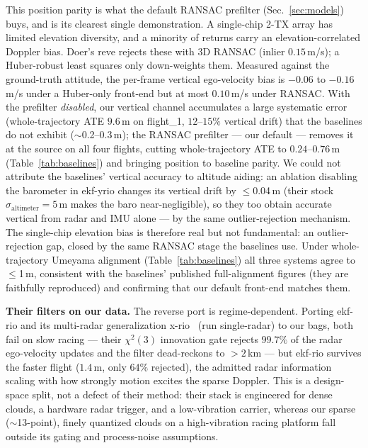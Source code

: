 \documentclass[conference]{IEEEtran}
\begin{document}
This position parity is what the default RANSAC prefilter
(Sec.~\ref{sec:models}) buys, and is its clearest single demonstration.
A single-chip 2-TX array has limited elevation diversity, and a minority
of returns carry an elevation-correlated Doppler bias.  Doer's
\mbox{reve} rejects these with 3D RANSAC (inlier $0.15$\,m/s); a
Huber-robust least squares only down-weights them.  Measured against the
ground-truth attitude, the per-frame vertical ego-velocity bias is
$-0.06$ to $-0.16$\,m/s under a Huber-only front-end but at most
$0.10$\,m/s under RANSAC.  With the prefilter \emph{disabled}, our
vertical channel accumulates a large systematic error
(whole-trajectory ATE $9.6$\,m on flight\_1, $12$--$15\%$ vertical
drift) that the baselines do not exhibit ($\sim$0.2--0.3\,m); the RANSAC
prefilter --- our default --- removes it at the source on all four
flights, cutting whole-trajectory ATE to $0.24$--$0.76$\,m
(Table~\ref{tab:baselines}) and bringing position to baseline
parity.  We could not attribute the baselines' vertical accuracy to
altitude aiding: an ablation disabling the barometer in ekf-yrio changes
its vertical drift by $\le$0.04\,m (their stock
$\sigma_\mathrm{altimeter}{=}5$\,m makes the baro near-negligible), so
they too obtain accurate vertical from radar and IMU alone --- by the
same outlier-rejection mechanism.  The single-chip elevation bias is
therefore real but not fundamental: an outlier-rejection gap, closed by
the same RANSAC stage the baselines use.  Under whole-trajectory Umeyama
alignment (Table~\ref{tab:baselines}) all three systems agree to
$\le$1\,m, consistent with the baselines' published full-alignment
figures (they are faithfully reproduced) and confirming that our default
front-end matches them.

\textbf{Their filters on our data.}  The reverse port is
regime-dependent.  Porting ekf-rio and its multi-radar generalization
x-rio~\cite{doer2021xrio} (run single-radar) to our bags, both fail on
slow racing --- their $\chi^2(3)$ innovation gate rejects $99.7\%$ of
the radar ego-velocity updates and the filter dead-reckons to $>2$\,km
--- but ekf-rio survives the faster flight ($1.4$\,m, only $64\%$
rejected), the admitted radar information scaling with how strongly
motion excites the sparse Doppler.  This is a design-space split, not a
defect of their method: their stack is engineered for dense clouds, a
hardware radar trigger, and a low-vibration carrier, whereas our sparse
($\sim$13-point), finely quantized clouds on a high-vibration racing
platform fall outside its gating and process-noise assumptions.
\end{document}
